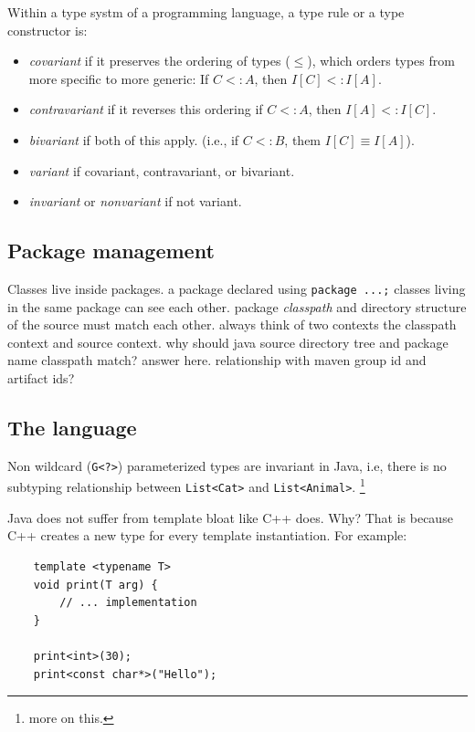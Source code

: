 \documentclass[a4paper]{article}
\begin{document}
Within a type systm of a programming language, a type rule or a type constructor is:

\begin{itemize}
    \item \emph{covariant} if it preserves the ordering of types (\(\leq\)), which orders types from more specific to more
          generic: If \(C <: A\), then \(I[C] <: I[A]\).
    \item \emph{contravariant} if it reverses this ordering if \(C <: A\), then \(I[A] <: I[C]\).
    \item \emph{bivariant} if both of this apply. (i.e., if \(C <: B\), them \(I[C] \equiv I[A]\)).
    \item \emph{variant} if covariant, contravariant, or bivariant.
    \item \emph{invariant} or \emph{nonvariant} if not variant.
\end{itemize}

\subsection*{Package management}
Classes live inside packages. a package declared using \lstinline{package ...;} classes living in the same 
package can see each other. package \emph{classpath} and directory structure of the source must match each other. 
always think of two contexts the classpath context and source context. why should java source directory tree and
package name classpath match? answer here. relationship with maven group id and artifact ids?

\subsection*{The language}

Non wildcard (\lstinline{G<?>}) parameterized types are invariant in Java, i.e, there is no subtyping relationship between
\lstinline{List<Cat>} and \lstinline{List<Animal>}. \footnote{more on this.}

Java does not suffer from template bloat like C++ does. Why? That is because C++ creates a new type for every template 
instantiation. For example:

\lstset{style=custom-cpp}
\begin{lstlisting}
    template <typename T>
    void print(T arg) {
        // ... implementation
    }

    print<int>(30);
    print<const char*>("Hello");
\end{lstlisting}
\end{document}
